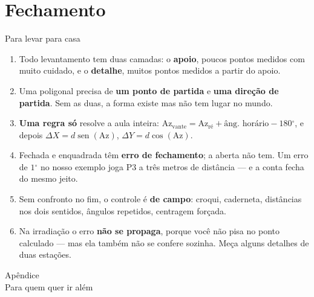 \documentclass[aspectratio=169,11pt]{beamer}
\newcommand{\bnum}[1]{\textbf{\textcolor{mTeal}{#1}}}
\begin{document}
\section{Fechamento}

\begin{frame}{Para levar para casa}
  \footnotesize
  \begin{enumerate}
    \setlength{\itemsep}{3.5pt}
    \item Todo levantamento tem duas camadas: o \textcolor{corApoio}{\textbf{apoio}}, poucos
          pontos medidos com muito cuidado, e o \textcolor{corDetalhe}{\textbf{detalhe}},
          muitos pontos medidos a partir do apoio.
    \item Uma poligonal precisa de \bnum{um ponto de partida} e \bnum{uma direção de
          partida}. Sem as duas, a forma existe mas não tem lugar no mundo.
    \item \bnum{Uma regra só} resolve a aula inteira:
          $\text{Az}_{\text{vante}} = \text{Az}_{\text{ré}} + \text{âng.\ horário} -
          180\ensuremath{^\circ}$, e depois
          $\Delta X = d\operatorname{sen}(\text{Az})$, $\Delta Y = d\cos(\text{Az})$.
    \item Fechada e enquadrada têm \bnum{erro de fechamento}; a aberta não tem. Um erro de
          $1\ensuremath{^\circ}$ no nosso exemplo joga P3 a \alert{três metros} de distância
          --- e a conta fecha do mesmo jeito.
    \item Sem confronto no fim, o controle é \bnum{de campo}: croqui, caderneta, distâncias
          nos dois sentidos, ângulos repetidos, centragem forçada.
    \item Na irradiação o erro \bnum{não se propaga}, porque você não pisa no ponto
          calculado --- mas ela também não se confere sozinha. Meça alguns detalhes de duas
          estações.
  \end{enumerate}
\end{frame}

\appendix

\begin{frame}[standout]
  Apêndice\\[6pt]
  {\normalsize Para quem quer ir além}
\end{frame}
\end{document}
